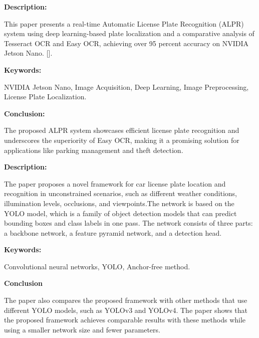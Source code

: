 
{ 
	
	\textbf{Description:} 
	
	This paper presents a real-time Automatic License Plate Recognition (ALPR) system using deep learning-based plate localization and a comparative analysis of Tesseract OCR and Easy OCR, achieving over 95 percent accuracy on NVIDIA Jetson Nano. [\autocite{Awalgaonkar:2021}].
	
	
	
	\textbf{Keywords:} 
	
	NVIDIA Jetson Nano, Image Acquisition, Deep Learning, Image Preprocessing, License Plate Localization.
	
	\textbf{Conclusion:} 
	
	The proposed ALPR system showcases efficient license plate recognition and underscores the superiority of Easy OCR, making it a promising solution for applications like parking management and theft detection.
	
}




{ 
	
	\textbf{Description:} 
	
	The paper proposes a novel framework for car license plate location and recognition in unconstrained scenarios, such as different weather conditions, illumination levels, occlusions, and viewpoints.The network is based on the YOLO model, which is a family of object detection models that can predict bounding boxes and class labels in one pass. The network consists of three parts: a backbone network, a feature pyramid network, and a detection head.\autocite{Qin:2020}
	
	\textbf{Keywords:} 
	
	Convolutional neural networks, YOLO, Anchor-free method.
	
	\textbf{Conclusion} 
	
	The paper also compares the proposed framework with other methods that use different YOLO models, such as YOLOv3 and YOLOv4. The paper shows that the proposed framework achieves comparable results with these methods while using a smaller network size and fewer parameters.
	}


